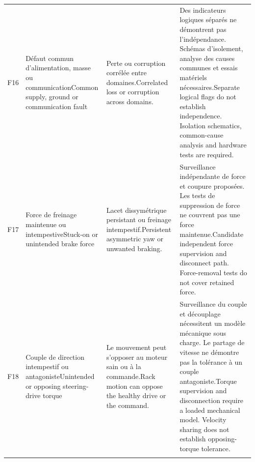 \documentclass[11pt,a4paper,oneside]{report}
\newcommand{\bi}[2]{\iffrench #2\else #1\fi}
\begin{document}
\begin{longtable}{@{}p{12mm}>{\raggedright\arraybackslash}p{33mm}>{\raggedright\arraybackslash}p{42mm}>{\raggedright\arraybackslash}p{57mm}@{}}
F16 & \bi{Common supply, ground or communication fault}{Défaut commun d'alimentation, masse ou communication} & \bi{Correlated loss or corruption across domains.}{Perte ou corruption corrélée entre domaines.} & \bi{Separate logical flags do not establish independence. Isolation schematics, common-cause analysis and hardware tests are required.}{Des indicateurs logiques séparés ne démontrent pas l'indépendance. Schémas d'isolement, analyse des causes communes et essais matériels nécessaires.}\\\addlinespace
F17 & \bi{Stuck-on or unintended brake force}{Force de freinage maintenue ou intempestive} & \bi{Persistent asymmetric yaw or unwanted braking.}{Lacet dissymétrique persistant ou freinage intempestif.} & \bi{Candidate independent force supervision and disconnect path. Force-removal tests do not cover retained force.}{Surveillance indépendante de force et coupure proposées. Les tests de suppression de force ne couvrent pas une force maintenue.}\\\addlinespace
F18 & \bi{Unintended or opposing steering-drive torque}{Couple de direction intempestif ou antagoniste} & \bi{Rack motion can oppose the healthy drive or the command.}{Le mouvement peut s'opposer au moteur sain ou à la commande.} & \bi{Torque supervision and disconnection require a loaded mechanical model. Velocity sharing does not establish opposing-torque tolerance.}{Surveillance du couple et découplage nécessitent un modèle mécanique sous charge. Le partage de vitesse ne démontre pas la tolérance à un couple antagoniste.}\\\addlinespace
\bottomrule\end{longtable}\endgroup
\end{document}
